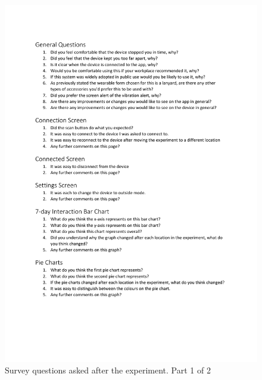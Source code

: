 \documentclass{l4proj}
\begin{document}
\begin{appendices}
    \begin{figure}[!htb]
        \centering
        \includegraphics[width=0.85\linewidth]{images/contact-survey_questions 1.pdf}

        \caption{ Survey questions asked after the experiment. Part 1 of 2 }

        \label{fig:survey-questions-1}
    \end{figure}


\end{appendices}
\end{document}

